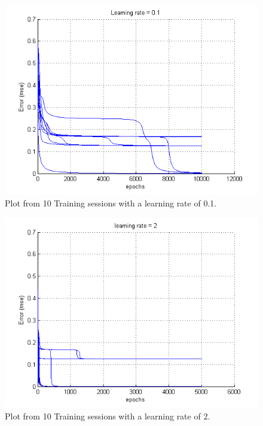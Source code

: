 \documentclass[a4paper]{article}
\begin{document}
\begin{figure}[h!] %
	\caption{\label{fig:plot2_LR01}Plot from 10 Training sessions with a learning rate of 0.1.}
	\includegraphics[]{plot2_LR01.png}
\end{figure}
\begin{figure}[h!] %
	\caption{\label{fig:plot2_LR2}Plot from 10 Training sessions with a learning rate of 2.}
	\includegraphics[]{plot2_LR2.png}
\end{figure}
\end{document}
